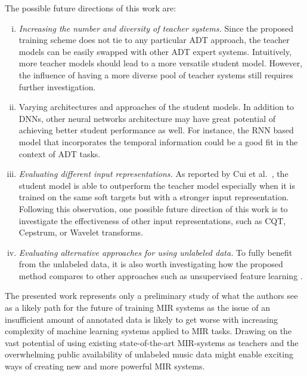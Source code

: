 \documentclass{article}
\begin{document}
The possible future directions of this work are:
\begin{enumerate}[(i)]
    \item   \textit{Increasing the number and diversity of teacher systems.} Since the proposed training scheme does not tie to any particular ADT approach, the teacher models can be easily swapped with other ADT expert systems. Intuitively, more teacher models should lead to a more versatile student model. However, the influence of having a more diverse pool of teacher systems still requires further investigation. 
    \item   Varying architectures and approaches of the student models. In addition to DNNs, other neural networks architecture may have great potential of achieving better student performance as well. For instance, the RNN based model that incorporates the temporal information could be a good fit in the context of ADT tasks. 
    \item   \textit{Evaluating different input representations.} As reported by Cui et al.~\cite{Cui2017}, the student model is able to outperform the teacher model especially when it is trained on the same soft targets but with a stronger input representation. Following this observation, one possible future direction of this work is to investigate the effectiveness of other input representations, such as CQT, Cepstrum, or Wavelet transforms. 
    \item   \textit{Evaluating alternative approaches for using unlabeled data.} To fully benefit from the unlabeled data, it is also worth investigating how the proposed method compares to other approaches such as unsupervised feature learning \cite{Raina2007a}. 
\end{enumerate}

The presented work represents only a preliminary study of what the authors see as a likely path for the future of training MIR systems as the issue of an insufficient amount of annotated data is likely to get worse with increasing complexity of machine learning systems applied to MIR tasks. Drawing on the vast potential of using existing state-of-the-art MIR-systems as teachers and the overwhelming public availability of unlabeled music data might enable exciting ways of creating new and more powerful MIR systems. %


\end{document}
